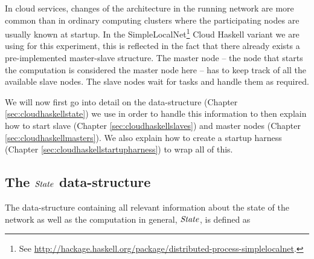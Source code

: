 \documentclass[paper=A4,twoside=true,openright,parskip=full,chapterprefix=true,headings=normal,bibliography=totoc,listof=totoc,titlepage=on,captions=tableabove,draft=false,british]{scrreprt}%
\begin{document}
\label{sec:nodeDiscAndHarness}

In cloud services, changes of the architecture in the running network
are more common than in ordinary computing clusters where the
participating nodes are usually known at startup. In the
SimpleLocalNet\footnote{See
  \url{http://hackage.haskell.org/package/distributed-process-simplelocalnet}.}
Cloud Haskell variant we are using for this experiment, this is
reflected in the fact that there already exists a pre-implemented
master-slave structure. The master node -- the node that starts the
computation is considered the master node here -- has to keep track of
all the available slave nodes. The slave nodes wait for tasks and handle
them as required.

We will now first go into detail on the data-structure (Chapter
\ref{sec:cloudhaskellstate}) we use in order to handle this information
to then explain how to start slave (Chapter
\ref{sec:cloudhaskellslaves}) and master nodes (Chapter
\ref{sec:cloudhaskellmasters}). We also explain how to create a startup
harness (Chapter \ref{sec:cloudhaskellstartupharness}) to wrap all of
this.

\hypertarget{the-state-data-structure}{%
\subsection{\texorpdfstring{The \ensuremath{\Conid{State}}
data-structure}{The  data-structure}}\label{the-state-data-structure}}

\label{sec:cloudhaskellstate}

The data-structure containing all relevant information about the state
of the network as well as the computation in general, \ensuremath{\Conid{State}}, is
defined as


\resethooks
\vspace{-2\baselineskip}
\end{document}
